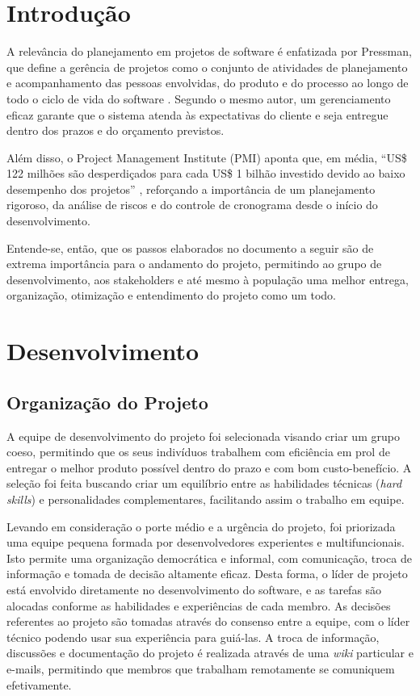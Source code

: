 \documentclass[a5paper, 12pt]{article}
\begin{document}

\newpage

\section{Introdução}
A relevância do planejamento em projetos de software é enfatizada por Pressman, que define a gerência de projetos como o conjunto de atividades de planejamento e acompanhamento das pessoas envolvidas, do produto e do processo ao longo de todo o ciclo de vida do software \cite{pressman2010}. Segundo o mesmo autor, um gerenciamento eficaz garante que o sistema atenda às expectativas do cliente e seja entregue dentro dos prazos e do orçamento previstos.  

Além disso, o Project Management Institute (PMI) aponta que, em média, “US\$ 122 milhões são desperdiçados para cada US\$ 1 bilhão investido devido ao baixo desempenho dos projetos” \cite{pmi-2016}, reforçando a importância de um planejamento rigoroso, da análise de riscos e do controle de cronograma desde o início do desenvolvimento.  

Entende-se, então, que os passos elaborados no documento a seguir são de extrema importância para o andamento do projeto, permitindo ao grupo de desenvolvimento, aos stakeholders e até mesmo à população uma melhor entrega, organização, otimização e entendimento do projeto como um todo.

\newpage
\section{Desenvolvimento}
\subsection{Organização do Projeto}
A equipe de desenvolvimento do projeto foi selecionada visando criar um grupo coeso, permitindo que os seus indivíduos trabalhem com eficiência em prol de entregar o melhor produto possível dentro do prazo e com bom custo-benefício. A seleção foi feita buscando criar um equilíbrio entre as habilidades técnicas (\textit{hard skills}) e personalidades complementares, facilitando assim o trabalho em equipe.

Levando em consideração o porte médio e a urgência do projeto, foi priorizada uma equipe pequena formada por desenvolvedores experientes e multifuncionais. Isto permite uma organização democrática e informal, com comunicação, troca de informação e tomada de decisão altamente eficaz. Desta forma, o líder de projeto está envolvido diretamente no desenvolvimento do software, e as tarefas são alocadas conforme as habilidades e experiências de cada membro. As decisões referentes ao projeto são tomadas através do consenso entre a equipe, com o líder técnico podendo usar sua experiência para guiá-las. A troca de informação, discussões e documentação do projeto é realizada através de uma \textit{wiki} particular e e-mails, permitindo que membros que trabalham remotamente se comuniquem efetivamente.
\end{document}
